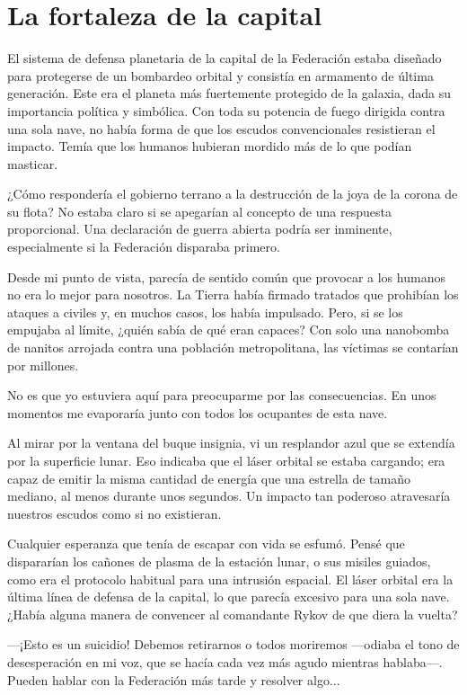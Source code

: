 \chapter{La fortaleza de la capital}\label{sec:la-fortaleza-de-la-capital}

El sistema de defensa planetaria de la capital de la Federación estaba diseñado para protegerse de un bombardeo orbital y consistía en armamento de última generación. Este era el planeta más fuertemente protegido de la galaxia, dada su importancia política y simbólica. Con toda su potencia de fuego dirigida contra una sola nave, no había forma de que los escudos convencionales resistieran el impacto. Temía que los humanos hubieran mordido más de lo que podían masticar.

¿Cómo respondería el gobierno terrano a la destrucción de la joya de la corona de su flota? No estaba claro si se apegarían al concepto de una respuesta proporcional. Una declaración de guerra abierta podría ser inminente, especialmente si la Federación disparaba primero.

Desde mi punto de vista, parecía de sentido común que provocar a los humanos no era lo mejor para nosotros. La Tierra había firmado tratados que prohibían los ataques a civiles y, en muchos casos, los había impulsado. Pero, si se los empujaba al límite, ¿quién sabía de qué eran capaces? Con solo una nanobomba de nanitos arrojada contra una población metropolitana, las víctimas se contarían por millones.

No es que yo estuviera aquí para preocuparme por las consecuencias. En unos momentos me evaporaría junto con todos los ocupantes de esta nave.

Al mirar por la ventana del buque insignia, vi un resplandor azul que se extendía por la superficie lunar. Eso indicaba que el láser orbital se estaba cargando; era capaz de emitir la misma cantidad de energía que una estrella de tamaño mediano, al menos durante unos segundos. Un impacto tan poderoso atravesaría nuestros escudos como si no existieran.

Cualquier esperanza que tenía de escapar con vida se esfumó. Pensé que dispararían los cañones de plasma de la estación lunar, o sus misiles guiados, como era el protocolo habitual para una intrusión espacial. El láser orbital era la última línea de defensa de la capital, lo que parecía excesivo para una sola nave. ¿Había alguna manera de convencer al comandante Rykov de que diera la vuelta?

—¡Esto es un suicidio! Debemos retirarnos o todos moriremos —odiaba el tono de desesperación en mi voz, que se hacía cada vez más agudo mientras hablaba—. Pueden hablar con la Federación más tarde y resolver algo...


